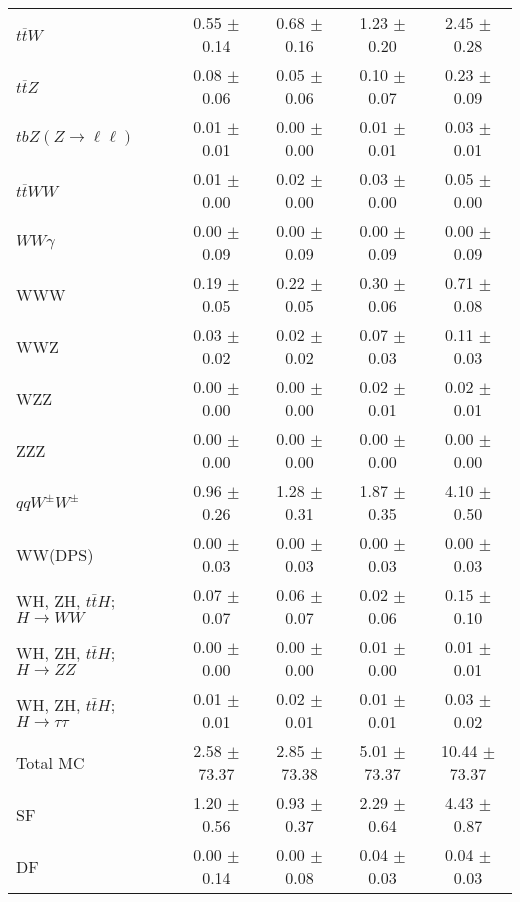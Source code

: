 \begin{tabular}{l|cccc}
                   $t\overline{t}W$ &  0.55 $\pm$  0.14 &  0.68 $\pm$  0.16 &  1.23 $\pm$  0.20 &  2.45 $\pm$  0.28 \\
                   $t\overline{t}Z$ &  0.08 $\pm$  0.06 &  0.05 $\pm$  0.06 &  0.10 $\pm$  0.07 &  0.23 $\pm$  0.09 \\
    $tbZ (Z \rightarrow \ell \ell)$ &  0.01 $\pm$  0.01 &  0.00 $\pm$  0.00 &  0.01 $\pm$  0.01 &  0.03 $\pm$  0.01 \\
                  $t\overline{t}WW$ &  0.01 $\pm$  0.00 &  0.02 $\pm$  0.00 &  0.03 $\pm$  0.00 &  0.05 $\pm$  0.00 \\
                         $WW\gamma$ &  0.00 $\pm$  0.09 &  0.00 $\pm$  0.09 &  0.00 $\pm$  0.09 &  0.00 $\pm$  0.09 \\
                                WWW &  0.19 $\pm$  0.05 &  0.22 $\pm$  0.05 &  0.30 $\pm$  0.06 &  0.71 $\pm$  0.08 \\
                                WWZ &  0.03 $\pm$  0.02 &  0.02 $\pm$  0.02 &  0.07 $\pm$  0.03 &  0.11 $\pm$  0.03 \\
                                WZZ &  0.00 $\pm$  0.00 &  0.00 $\pm$  0.00 &  0.02 $\pm$  0.01 &  0.02 $\pm$  0.01 \\
                                ZZZ &  0.00 $\pm$  0.00 &  0.00 $\pm$  0.00 &  0.00 $\pm$  0.00 &  0.00 $\pm$  0.00 \\
                 $qqW^{\pm}W^{\pm}$ &  0.96 $\pm$  0.26 &  1.28 $\pm$  0.31 &  1.87 $\pm$  0.35 &  4.10 $\pm$  0.50 \\
                            WW(DPS) &  0.00 $\pm$  0.03 &  0.00 $\pm$  0.03 &  0.00 $\pm$  0.03 &  0.00 $\pm$  0.03 \\
WH, ZH, $t\bar{t}H$; $H \rightarrow WW$ &  0.07 $\pm$  0.07 &  0.06 $\pm$  0.07 &  0.02 $\pm$  0.06 &  0.15 $\pm$  0.10 \\
WH, ZH, $t\bar{t}H$; $H \rightarrow ZZ$ &  0.00 $\pm$  0.00 &  0.00 $\pm$  0.00 &  0.01 $\pm$  0.00 &  0.01 $\pm$  0.01 \\
WH, ZH, $t\bar{t}H$; $H \rightarrow \tau\tau$ &  0.01 $\pm$  0.01 &  0.02 $\pm$  0.01 &  0.01 $\pm$  0.01 &  0.03 $\pm$  0.02 \\
\hline\hline
                           Total MC &  2.58 $\pm$ 73.37 &  2.85 $\pm$ 73.38 &  5.01 $\pm$ 73.37 & 10.44 $\pm$ 73.37 \\
\hline
                                 SF &  1.20 $\pm$  0.56 &  0.93 $\pm$  0.37 &  2.29 $\pm$  0.64 &  4.43 $\pm$  0.87 \\
                                 DF &  0.00 $\pm$  0.14 &  0.00 $\pm$  0.08 &  0.04 $\pm$  0.03 &  0.04 $\pm$  0.03 \\

\end{tabular}
